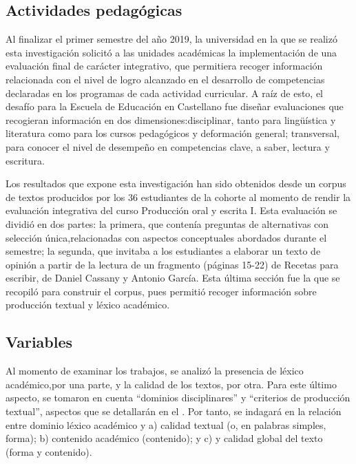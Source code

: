 \documentclass{textolivre}
\begin{document}
\subsection{Actividades pedagógicas}\label{sec-actividades}
Al finalizar el primer semestre del año 2019, la universidad en la que se
realizó esta investigación solicitó a las unidades académicas la implementación
de una evaluación final de carácter integrativo, que permitiera recoger
información relacionada con el nivel de logro alcanzado en el desarrollo de
competencias declaradas en los programas de cada actividad curricular. A raíz de
esto, el desafío para la Escuela de Educación en Castellano fue diseñar
evaluaciones que recogieran información en dos dimensiones:disciplinar, tanto
para lingüística y literatura como para los cursos pedagógicos y deformación
general; transversal, para conocer el nivel de desempeño en competencias clave,
a saber, lectura y escritura.

Los resultados que expone esta investigación han sido obtenidos desde un corpus
de textos producidos por los 36 estudiantes de la cohorte al momento de rendir
la evaluación integrativa del curso Producción oral y escrita I. Esta evaluación
se dividió en dos partes: la primera, que contenía preguntas de alternativas con
selección única,relacionadas con aspectos conceptuales abordados durante el
semestre; la segunda, que invitaba a los estudiantes a elaborar un texto de
opinión a partir de la lectura de un fragmento (páginas 15-22) de Recetas para
escribir, de Daniel Cassany y Antonio García. Esta última sección fue la que se
recopiló para construir el corpus, pues permitió recoger información sobre
producción textual y léxico académico.


\subsection{Variables}\label{sec-variables}
Al momento de examinar los trabajos, se analizó la presencia de léxico
académico,por una parte, y la calidad de los textos, por otra. Para este último
aspecto, se tomaron en cuenta “dominios disciplinares” y “criterios de
producción textual”, aspectos que se detallarán en el . Por tanto,
se indagará en la relación entre dominio léxico académico y a) calidad textual
(o, en palabras simples, forma); b) contenido académico (contenido); y c) y
calidad global del texto (forma y contenido).
\end{document}
